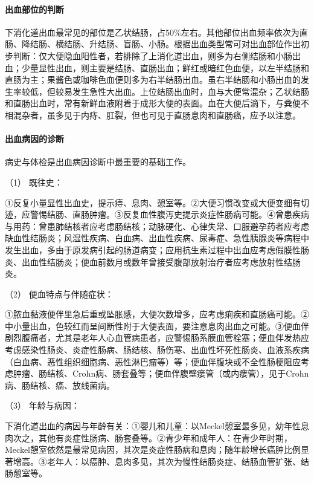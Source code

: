 \paragraph{出血部位的判断}

下消化道出血最常见的部位是乙状结肠，占50\%左右。其他部位出血频率依次为直肠、降结肠、横结肠、升结肠、盲肠、小肠。根据出血类型常可对出血部位作出初步判断：仅大便隐血阳性者，若排除了上消化道出血，则多为右侧结肠和小肠出血；少量显性出血，则主要是结肠、直肠出血；鲜红或暗红色血便，以左半结肠和直肠为主；果酱色或咖啡色血便则多为右半结肠出血。虽右半结肠和小肠出血的发生率较低，但较易发生急性大出血。上位结肠出血时，血与大便常混杂；乙状结肠和直肠出血时，常有新鲜血液附着于成形大便的表面。血在大便后滴下，与粪便不相混杂者，虽多见于内痔、肛裂，但也可见于直肠息肉和直肠癌，应予以注意。

\paragraph{出血病因的诊断}

病史与体检是出血病因诊断中最重要的基础工作。

\hypertarget{text00033.htmlux5cux23CHP1-13-2-1-5-1}{}
（1） 既往史：

①反复小量显性出血史，提示痔、息肉、憩室等。②大便习惯改变或大便变细有切迹，应警惕结肠、直肠肿瘤。③反复血性腹泻史提示炎症性肠病可能。④曾患疾病与用药：曾患肺结核者应考虑肠结核；动脉硬化、心律失常、口服避孕药者应考虑缺血性结肠炎；风湿性疾病、白血病、出血性疾病、尿毒症、急性胰腺炎等病程中发生出血，多由于原发病引起的肠道病变；应用抗生素过程中出血应考虑假膜性肠炎、出血性结肠炎；便血前数月或数年曾接受腹部放射治疗者应考虑放射性结肠炎。

\hypertarget{text00033.htmlux5cux23CHP1-13-2-1-5-2}{}
（2） 便血特点与伴随症状：

①脓血黏液便伴里急后重或坠胀感，大便次数增多，应考虑痢疾和直肠癌可能。②中小量出血，色较红而呈间断性附于大便表面，要注意息肉出血之可能。③便血伴剧烈腹痛者，尤其是老年人心血管病患者，应警惕肠系膜血管栓塞；便血伴发热应考虑感染性肠炎、炎症性肠病、肠结核、肠伤寒、出血性坏死性肠炎、血液系疾病（白血病、恶性组织细胞病、恶性淋巴瘤等）等；便血伴腹块或不全性肠梗阻应考虑肿瘤、肠结核、Crohn病、肠套叠等；便血伴腹壁瘘管（或内瘘管），见于Crohn病、肠结核、癌、放线菌病。

\hypertarget{text00033.htmlux5cux23CHP1-13-2-1-5-3}{}
（3） 年龄与病因：

下消化道出血的病因与年龄有关：①婴儿和儿童：以Meckel憩室最多见，幼年性息肉次之，其他有炎症性肠病、肠套叠等。②青少年和成年人：在青少年时期，Meckel憩室依然是最常见病因，其次是炎症性肠病和息肉；随年龄增长癌肿比例显著增高。③老年人：以癌肿、息肉多见，其次为慢性结肠炎症、结肠血管扩张、结肠憩室等。

